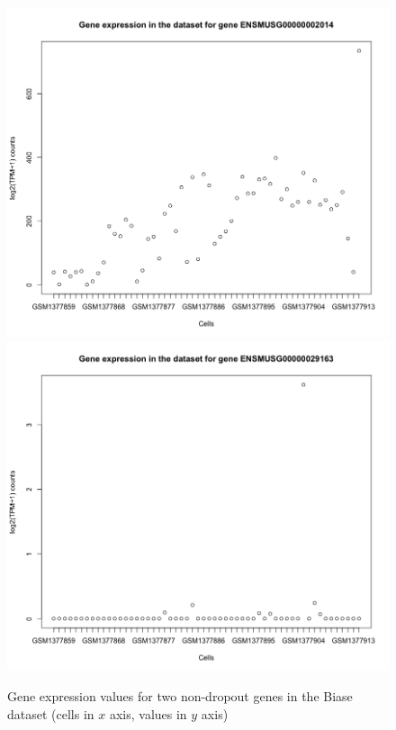 \documentclass{report}
\begin{document}
{\begin{figure}[H]
\centering
\subfigure\includegraphics[scale=0.35]{plotsCopula/biase/depCellGene_nodropout_biase.png}
\subfigure\includegraphics[scale=0.35]{plotsCopula/biase/depCellGene2_nodropout_biase.png}
\caption{Gene expression values for two non-dropout genes in the Biase dataset (cells in $x$ axis, values in $y$ axis)}
\label{geneexpression3}
\end{figure}

}
\end{document}
